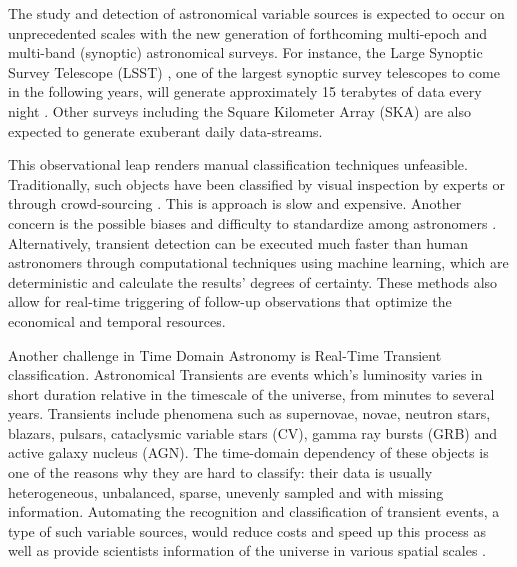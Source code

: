
The study and detection of astronomical variable sources is expected
to occur on unprecedented scales with the new generation of
forthcoming multi-epoch and multi-band (synoptic) astronomical
surveys. 
For instance, the Large Synoptic Survey Telescope (LSST)
\citep{0805.2366}, one of the largest synoptic survey telescopes to
come in the following years, will generate approximately 15 terabytes
of data every night \citep{1512.07914}.  
Other surveys including the Square Kilometer Array (SKA) are also expected
to generate exuberant daily data-streams. 

This observational leap renders manual classification techniques
unfeasible.   
Traditionally, such objects have been classified by visual inspection
by experts or through crowd-sourcing
\citep{1011.2199,0708.2750}. 
This is approach is slow and expensive.
Another concern is the possible biases and difficulty to standardize among 
astronomers \citep{1104.3142}. 
Alternatively, transient detection can be executed much faster than
human astronomers through computational techniques using machine
learning, 
which are deterministic and calculate the results' degrees of
certainty. 
These methods also allow for real-time triggering of follow-up
observations that optimize the economical and temporal resources. 
 

Another challenge in  Time Domain Astronomy is Real-Time Transient classification. 
Astronomical Transients are events which's luminosity varies in short duration
relative in the timescale of the universe, from minutes to several
years. 
Transients include phenomena such as supernovae, novae, neutron
stars, blazars, pulsars, cataclysmic variable stars (CV), gamma ray
bursts (GRB) and active galaxy nucleus (AGN). 
The time-domain dependency of these objects is one of the reasons why
they are hard to classify: their data is usually heterogeneous,
unbalanced, sparse, unevenly sampled and with missing information. 
Automating the recognition and classification of transient events, a type of such
variable sources, would reduce costs and speed up this process as well
as provide scientists information of the universe in various spatial
scales \citep{2011arXiv1110.4655D}.  

